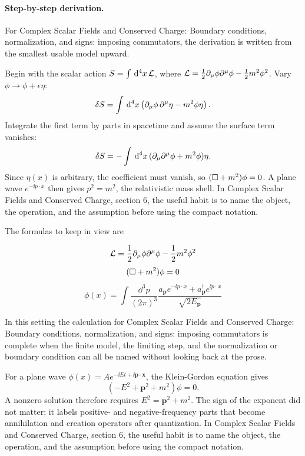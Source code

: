 \paragraph{Step-by-step derivation.}

For Complex Scalar Fields and Conserved Charge: Boundary conditions, normalization, and signs: imposing commutators, the derivation is written from the smallest usable model upward.

Begin with the scalar action \(S=\int\,\mathrm d^4x\,\mathcal L\), where \(\mathcal L=\frac12\partial_\mu\phi\partial^\mu\phi-\frac12m^2\phi^2\).  Vary \(\phi\to\phi+\epsilon\eta\):
\[
  \delta S=\int\,\mathrm d^4x\left(\partial_\mu\phi\,\partial^\mu\eta-m^2\phi\eta\right).
\]
Integrate the first term by parts in spacetime and assume the surface term vanishes:
\[
  \delta S=-\int\,\mathrm d^4x\,(\partial_\mu\partial^\mu\phi+m^2\phi)\eta.
\]
Since \(\eta(x)\) is arbitrary, the coefficient must vanish, so \((\Box+m^2)\phi=0\).  A plane wave \(e^{-\ii p\cdot x}\) then gives \(p^2=m^2\), the relativistic mass shell.  In Complex Scalar Fields and Conserved Charge, section 6, the useful habit is to name the object, the operation, and the assumption before using the compact notation.

The formulas to keep in view are

\[
  \mathcal L=\frac12\partial_\mu\phi\partial^\mu\phi-\frac12m^2\phi^2
\]
\[
  (\Box+m^2)\phi=0
\]
\[
  \phi(x)=\int\frac{\dd^3p}{(2\pi)^3}\frac{a_{\bm p}e^{-\ii p\cdot x}+a_{\bm p}^\dagger e^{\ii p\cdot x}}{\sqrt{2E_{\bm p}}}
\]

In this setting the calculation for Complex Scalar Fields and Conserved Charge: Boundary conditions, normalization, and signs: imposing commutators is complete when the finite model, the limiting step, and the normalization or boundary condition can all be named without looking back at the prose.




\begin{example}
For a plane wave \(\phi(x)=Ae^{-\ii Et+\ii\bm p\cdot\bm x}\), the Klein-Gordon equation gives
\[
  (-E^2+\bm p^2+m^2)\phi=0.
\]
A nonzero solution therefore requires \(E^2=\bm p^2+m^2\).  The sign of the exponent did not matter; it labels positive- and negative-frequency parts that become annihilation and creation operators after quantization.  In Complex Scalar Fields and Conserved Charge, section 6, the useful habit is to name the object, the operation, and the assumption before using the compact notation.
\end{example}



